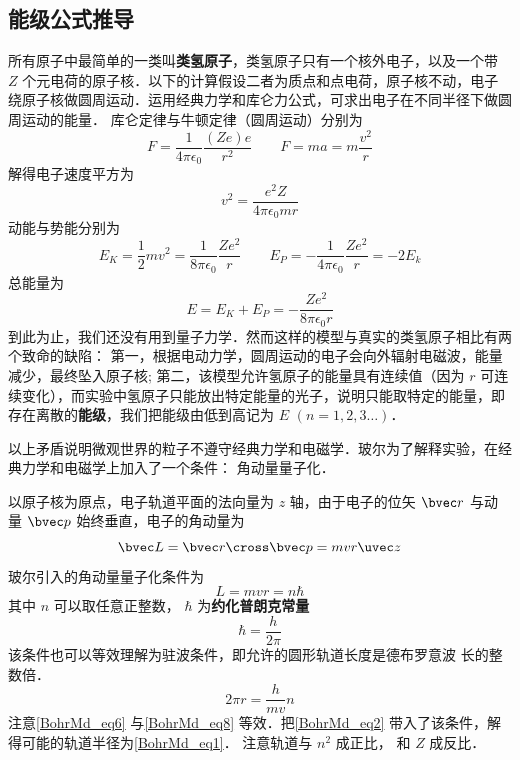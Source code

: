 \subsection{能级公式推导}
所有原子中最简单的一类叫\textbf{类氢原子}，类氢原子只有一个核外电子，以及一个带 $Z$ 个元电荷的原子核．以下的计算假设二者为质点和点电荷，原子核不动，电子绕原子核做圆周运动．运用经典力学和库仑力公式，可求出电子在不同半径下做圆周运动的能量． 库仑定律与牛顿定律（圆周运动）分别为
\begin{equation}
F = \frac{1}{4\pi \epsilon_0} \frac{(Ze)e}{r^2}
\qquad
F = ma = m\frac{v^2}{r}
\end{equation}
解得电子速度平方为
\begin{equation}\label{BohrMd_eq2}
v^2 = \frac{e^2 Z}{4\pi \epsilon_0 mr}
\end{equation}
动能与势能分别为
\begin{equation}
E_K = \frac12 m v^2 = \frac{1}{8\pi\epsilon_0} \frac{Z e^2}{r}
\qquad
E_P =  -\frac{1}{4\pi\epsilon_0} \frac{Ze^2}{r} = -2 E_k
\end{equation}   
总能量为
\begin{equation}\label{BohrMd_eq4}
E = E_K + E_P =  -\frac{Z e^2}{8\pi\epsilon_0 r}
\end{equation}
到此为止，我们还没有用到量子力学．然而这样的模型与真实的类氢原子相比有两个致命的缺陷： 第一，根据电动力学，圆周运动的电子会向外辐射电磁波，能量减少，最终坠入原子核; 第二，该模型允许氢原子的能量具有连续值（因为 $r$ 可连续变化），而实验中氢原子只能放出特定能量的光子，说明只能取特定的能量，即存在离散的\textbf{能级}，我们把能级由低到高记为 $E$  $(n = 1,2,3\dots)$． 

以上矛盾说明微观世界的粒子不遵守经典力学和电磁学．玻尔为了解释实验，在经典力学和电磁学上加入了一个条件： 角动量量子化．

以原子核为原点，电子轨道平面的法向量为 $z$ 轴，由于电子的位矢 $\bvec r$ 与动量 $\bvec p$ 始终垂直，电子的角动量为
\begin{equation}
\bvec L = \bvec r \cross \bvec p = mvr \uvec z
\end{equation}
玻尔引入的角动量量子化条件为
\begin{equation}\label{BohrMd_eq6}
L = mvr = n\hbar
\end{equation}
其中 $n$ 可以取任意正整数， $\hbar$ 为\textbf{约化普朗克常量}
\begin{equation}\label{BohrMd_eq7}
\hbar  = \frac{h}{2\pi}
\end{equation}
该条件也可以等效理解为驻波条件，即允许的圆形轨道长度是德布罗意波%
长的整数倍．
\begin{equation}\label{BohrMd_eq8}
2\pi r  = \frac{h}{mv} n
\end{equation}
注意\autoref{BohrMd_eq6} 与\autoref{BohrMd_eq8} 等效．把\autoref{BohrMd_eq2} 带入了该条件，解得可能的轨道半径为\autoref{BohrMd_eq1}． 注意轨道与 $n^2$ 成正比， 和 $Z$ 成反比．

